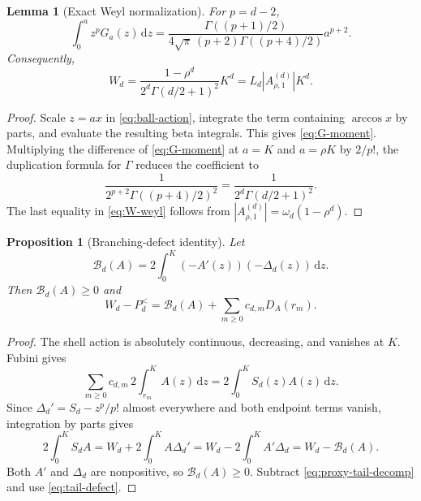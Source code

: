 \documentclass[11pt]{article}
\newtheorem{proposition}[theorem]{Proposition}
\newtheorem{lemma}[theorem]{Lemma}
\theoremstyle{remark}
\newcommand{\dd}{\,\mathrm d}
\begin{document}
\begin{lemma}[Exact Weyl normalization]
\label{lem:W-normalization}
For $p=d-2$,
\begin{equation}
 \int_0^a z^pG_a(z)\dd z
 =\frac{\Gamma((p+1)/2)}
 {4\sqrt\pi\,(p+2)\Gamma((p+4)/2)}a^{p+2}.
 \label{eq:G-moment}
\end{equation}
Consequently,
\begin{equation}
 \boxed{
 W_d=\frac{1-\rho^d}{2^d\Gamma(d/2+1)^2}K^d
 =L_d|A_{\rho,1}^{(d)}|K^d.}
 \label{eq:W-weyl}
\end{equation}
\end{lemma}

\begin{proof}
Scale $z=ax$ in \eqref{eq:ball-action}, integrate the term containing
$\arccos x$ by parts, and evaluate the resulting beta integrals.  This
gives \eqref{eq:G-moment}.  Multiplying the difference of
\eqref{eq:G-moment} at $a=K$ and $a=\rho K$ by $2/p!$, the duplication
formula for $\Gamma$ reduces the coefficient to
\[
 \frac1{2^{p+2}\Gamma((p+4)/2)^2}
 =\frac1{2^d\Gamma(d/2+1)^2}.
\]
The last equality in \eqref{eq:W-weyl} follows from
$|A_{\rho,1}^{(d)}|=\omega_d(1-\rho^d)$.
\end{proof}

\begin{proposition}[Branching-defect identity]
\label{prop:defect-identity}
Let
\begin{equation}
 \mathcal B_d(A)=2\int_0^K
 (-A'(z))(-\Delta_d(z))\dd z.
 \label{eq:B-def}
\end{equation}
Then $\mathcal B_d(A)\geq0$ and
\begin{equation}
 \boxed{
 W_d-P_d^{<}=\mathcal B_d(A)
 +\sum_{m\geq0}c_{d,m}D_A(r_m).}
 \label{eq:master-defect}
\end{equation}
\end{proposition}

\begin{proof}
The shell action is absolutely continuous, decreasing, and vanishes at
$K$.  Fubini gives
\[
 \sum_{m\geq0}c_{d,m}\,2\int_{r_m}^K A(z)\dd z
 =2\int_0^KS_d(z)A(z)\dd z.
\]
Since $\Delta_d'=S_d-z^p/p!$ almost everywhere and both endpoint terms
vanish, integration by parts gives
\[
 2\int_0^KS_dA
 =W_d+2\int_0^K A\Delta_d'
 =W_d-2\int_0^K A'\Delta_d
 =W_d-\mathcal B_d(A).
\]
Both $A'$ and $\Delta_d$ are nonpositive, so
$\mathcal B_d(A)\geq0$.  Subtract \eqref{eq:proxy-tail-decomp} and use
\eqref{eq:tail-defect}.
\end{proof}
\end{document}
